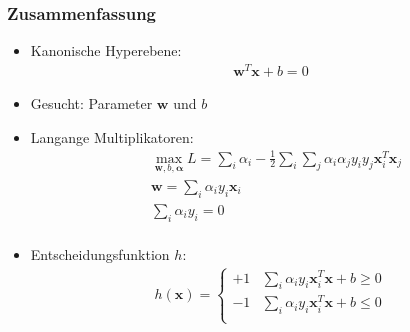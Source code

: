 \begin{frame}
    \frametitle{Zusammenfassung}

    \begin{itemize}
        \item Kanonische Hyperebene:
            \begin{align*}
                \boldsymbol{w}^T \boldsymbol{x} + b = 0
            \end{align*}
        \item Gesucht: Parameter $\boldsymbol{w}$ und $b$
        \item Langange Multiplikatoren:
            \begin{align*}
                & \max_{\boldsymbol{w}, b, \boldsymbol{\alpha}} L = \sum_i \alpha_i - \frac{1}{2} \sum_i \sum_j \alpha_i \alpha_j y_i y_j \boldsymbol{x}_i^T \boldsymbol{x}_j \\
                & \boldsymbol{w} = \sum_i \alpha_i y_i \boldsymbol{x}_i \\
                & \sum_i \alpha_i y_i = 0 \\
            \end{align*}
        \item Entscheidungsfunktion $h$:
            \begin{align*}
                h(\boldsymbol{x}) = \begin{cases}
                    +1 & \sum_i \alpha_i y_i \boldsymbol{x}_i^T \boldsymbol{x} + b \geq 0 \\
                    -1 & \sum_i \alpha_i y_i \boldsymbol{x}_i^T \boldsymbol{x} + b \leq 0 \\
                \end{cases}
            \end{align*}
    \end{itemize}
\end{frame}



